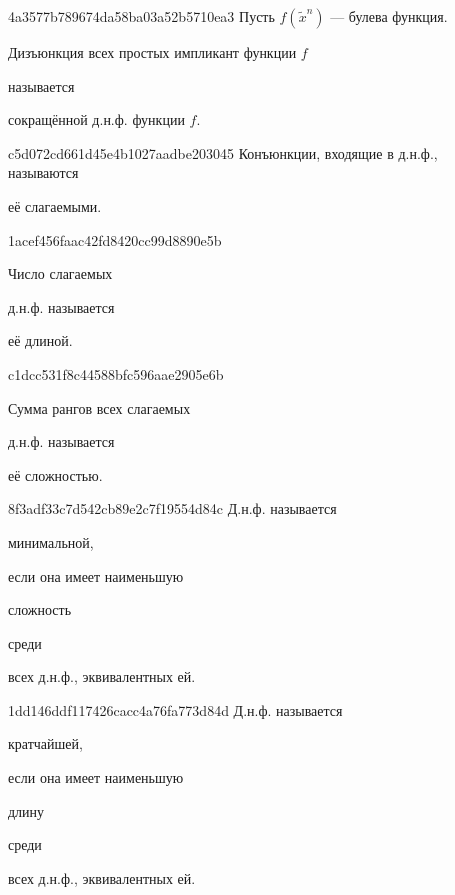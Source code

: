 \begin{note}{4a3577b789674da58ba03a52b5710ea3}
    Пусть \({ f(\widetilde x^{n}) }\) --- булева функция.
    \begin{icloze}{2}Дизъюнкция всех простых импликант функции \({ f }\)\end{icloze} называется \begin{icloze}{1}сокращённой д.н.ф. функции \({ f }\).\end{icloze}
\end{note}

\begin{note}{c5d072cd661d45e4b1027aadbe203045}
    Конъюнкции, входящие в д.н.ф., называются \begin{icloze}{1}её слагаемыми.\end{icloze}
\end{note}

\begin{note}{1acef456faac42fd8420cc99d8890e5b}
    \begin{icloze}{2}Число слагаемых\end{icloze} д.н.ф. называется \begin{icloze}{1}её длиной.\end{icloze}
\end{note}

\begin{note}{c1dcc531f8c44588bfc596aae2905e6b}
    \begin{icloze}{2}Сумма рангов всех слагаемых\end{icloze} д.н.ф. называется \begin{icloze}{1}её сложностью.\end{icloze}
\end{note}

\begin{note}{8f3adf33c7d542cb89e2c7f19554d84c}
    Д.н.ф. называется \begin{icloze}{3}минимальной,\end{icloze} если она имеет наименьшую \begin{icloze}{1}сложность\end{icloze} среди \begin{icloze}{2}всех д.н.ф., эквивалентных ей.\end{icloze}
\end{note}

\begin{note}{1dd146ddf117426cacc4a76fa773d84d}
    Д.н.ф. называется \begin{icloze}{3}кратчайшей,\end{icloze} если она имеет наименьшую \begin{icloze}{1}длину\end{icloze} среди \begin{icloze}{2}всех д.н.ф., эквивалентных ей.\end{icloze}
\end{note}

